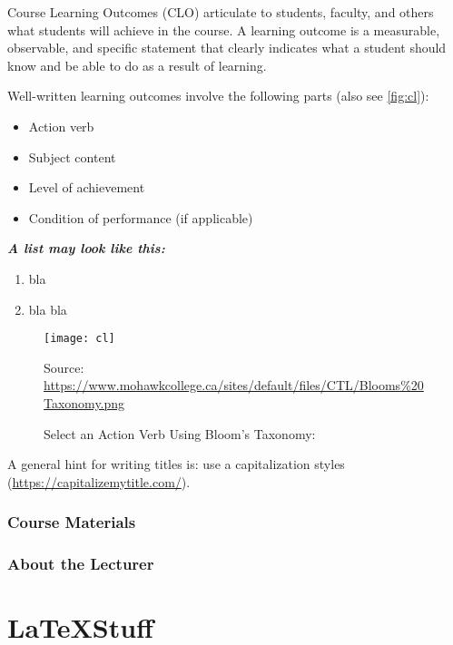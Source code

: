 \documentclass{article}
\begin{document}
Course Learning Outcomes (CLO) articulate to students, faculty, and others what students will achieve in the course.
A learning outcome  is a measurable, observable, and specific statement that clearly indicates what a student should know and be able to do as a result of learning.

Well-written learning outcomes involve the following parts (also see \autoref{fig:cl}):
\begin{itemize}
\item Action verb
\item Subject content 
\item Level of achievement 
\item Condition of performance (if applicable)
\end{itemize}

\noindent \textbf{\textit{A list may look like this:}}
\begin{enumerate}[CLO 1]
	\item bla 
	\item bla bla
\end{enumerate} 


\begin{figure}
	\centering
	\texttt{[image: cl]}
	\caption{Select an Action Verb Using Bloom’s Taxonomy:}\label{fig:cl}
	
\tiny	Source: \url{https://www.mohawkcollege.ca/sites/default/files/CTL/Blooms\%20Taxonomy.png}
\end{figure}

A general hint for writing titles is: use a capitalization styles (\url{https://capitalizemytitle.com/}).

\subsubsection*{Course Materials}
%


\subsubsection*{About the Lecturer}



\section{\LaTeX Stuff}
\end{document}
